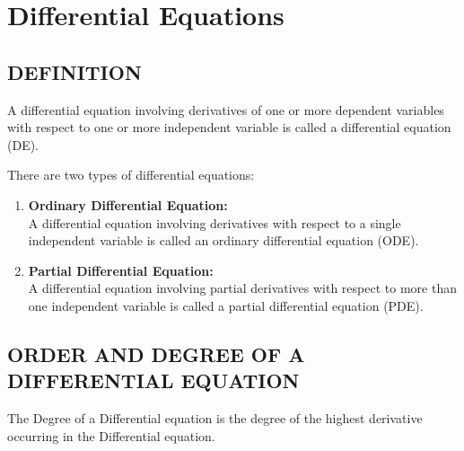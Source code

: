 \documentclass{report}
\begin{document}
\setcounter{chapter}{2}
\chapter{Differential Equations}

\section{DEFINITION}
A differential equation involving derivatives of one or more dependent variables with respect to one or more independent variable is called a differential equation (DE).

\vspace{1ex}
There are two types of differential equations:



\begin{enumerate}[label=\textbf{(\arabic*)}, itemsep=1ex, labelsep=10pt, align=right, left=0pt]
   \item \textbf{Ordinary Differential Equation:} \\
   A differential equation involving derivatives with respect to a single independent variable is called an ordinary differential equation (ODE).
   \item \textbf{Partial Differential Equation:} \\
   A differential equation involving partial derivatives with respect to more than one independent variable is called a partial differential equation (PDE).
\end{enumerate}

\section{ORDER AND DEGREE OF A DIFFERENTIAL EQUATION}
The Degree of a Differential equation is the degree of the
highest derivative occurring in the Differential equation.

\end{document}
